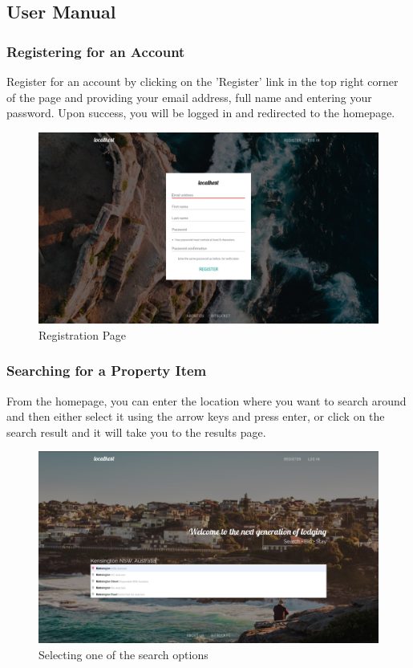 \subsection{User Manual}
\subsubsection{Registering for an Account}
Register for an account by clicking on the 'Register' link in the top right 
corner of the page and providing your email address, full name and entering
your password. Upon success, you will be logged in and redirected to the
homepage.

\begin{figure}[!h]
  \includegraphics[width=\linewidth]{assets/userManual/regPg.png}
  \caption{Registration Page}
  \label{fig:regPg}
\end{figure}

\subsubsection{Searching for a Property Item}
From the homepage, you can enter the location where you want to search around
and then either select it using the arrow keys and press enter, or click on the
search result and it will take you to the results page.

\begin{figure}[!h]
  \includegraphics[width=\linewidth]{assets/userManual/searchOption.png}
  \caption{Selecting one of the search options}
  \label{fig:searchOption}
\end{figure}

